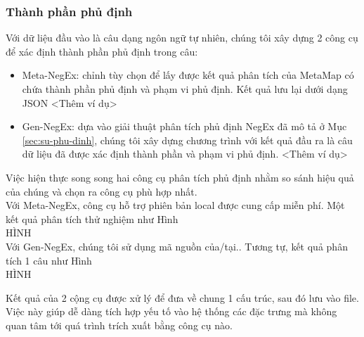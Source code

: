 \subsubsection*{Thành phần phủ định}
Với dữ liệu đầu vào là câu dạng ngôn ngữ tự nhiên, chúng tôi xây dựng 2 công cụ để xác định thành phần phủ định trong câu:
\begin{itemize}
\item Meta-NegEx: chỉnh tùy chọn  để lấy được kết quả phân tích của MetaMap có chứa thành phần phủ định và phạm vi phủ định. Kết quả lưu lại dưới dạng JSON <Thêm ví dụ>
\item Gen-NegEx: dựa vào giải thuật phân tích phủ định NegEx đã mô tả ở Mục \ref{sec:su-phu-dinh}, chúng tôi xây dựng chương trình với kết quả đầu ra là câu dữ liệu đã được xác định thành phần và phạm vi phủ định. <Thêm ví dụ>
\end{itemize}

Việc hiện thực song song hai công cụ phân tích phủ định nhằm so sánh hiệu quả của chúng và chọn ra công cụ phù hợp nhất.\\

Với Meta-NegEx, công cụ hỗ trợ phiên bản local được cung cấp miễn phí. Một kết quả phân tích thử nghiệm như Hình\\
HÌNH\\

Với Gen-NegEx, chúng tôi sử dụng mã nguồn của/tại.. Tương tự, kết quả phân tích 1 câu như Hình \\
HÌNH

Kết quả của 2 cộng cụ được xử lý để đưa về chung 1 cấu trúc, sau đó lưu vào file. Việc này giúp dễ dàng tích hợp yếu tố vào hệ thống các đặc trưng mà không quan tâm tới quá trình trích xuất bằng công cụ nào.

